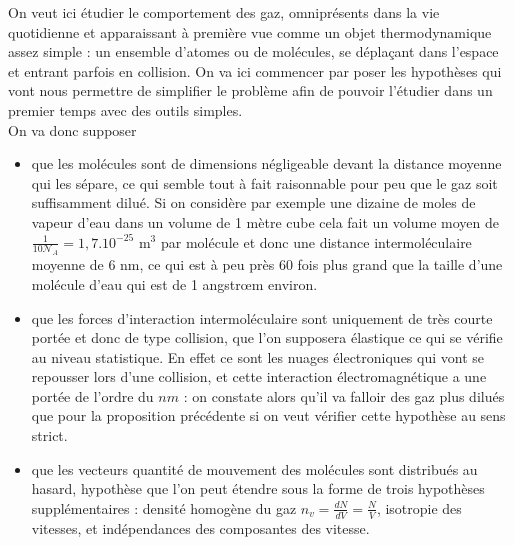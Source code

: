 \documentclass[12pt,prb,aps,epsf]{article}
\begin{document}
On veut ici étudier le comportement des gaz, omniprésents dans la vie quotidienne et apparaissant à première vue comme un objet thermodynamique assez simple : un ensemble d'atomes ou de molécules, se déplaçant dans l'espace et entrant parfois en collision. On va ici commencer par poser les hypothèses qui vont nous permettre de simplifier le problème afin de pouvoir l'étudier dans un premier temps avec des outils simples.\\
On va donc supposer 
\begin{itemize}
	\item que les molécules sont de dimensions négligeable devant la distance moyenne qui les sépare, ce qui semble tout à fait raisonnable pour peu que le gaz soit suffisamment dilué. Si on considère par exemple une dizaine de moles de vapeur d'eau dans un volume de 1 mètre cube cela fait un volume moyen de $\frac{1}{10\mathcal{N}_A} = 1,7.10^{-25}$ m$^{3}$ par molécule et donc une distance intermoléculaire moyenne de 6 nm, ce qui est à peu près 60 fois plus grand que la taille d'une molécule d'eau qui est de 1 angstrœm environ.
	\item que les forces d'interaction intermoléculaire sont uniquement de très courte portée et donc de type collision, que l'on supposera élastique ce qui se vérifie au niveau statistique. En effet ce sont les nuages électroniques qui vont se repousser lors d'une collision, et cette interaction électromagnétique a une portée de l'ordre du $nm$ : on constate alors qu'il va falloir des gaz plus dilués que pour la proposition précédente si on veut vérifier cette hypothèse au sens strict.
	\item que les vecteurs quantité de mouvement des molécules sont distribués au hasard, hypothèse que l'on peut étendre sous la forme de trois hypothèses supplémentaires : densité homogène du gaz $n_v = \frac{dN}{dV} = \frac{N}{V}$, isotropie des vitesses, et indépendances des composantes des vitesse.
\end{itemize}
\end{document}
